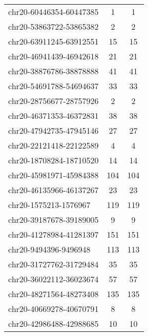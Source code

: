 \begin{longtable}{lSS}
	chr20-60446354-60447385 & 1      & 1                                         \\
	chr20-53863722-53865382 & 2      & 2                                         \\
	chr20-63911245-63912551 & 15     & 15                                        \\
	chr20-46941439-46942618 & 21     & 21                                        \\
	chr20-38876786-38878888 & 41     & 41                                        \\
	chr20-54691788-54694637 & 33     & 33                                        \\
	chr20-28756677-28757926 & 2      & 2                                         \\
	chr20-46371353-46372831 & 38     & 38                                        \\
	chr20-47942735-47945146 & 27     & 27                                        \\
	chr20-22121418-22122589 & 4      & 4                                         \\
	chr20-18708284-18710520 & 14     & 14                                        \\
	chr20-45981971-45984388 & 104    & 104                                       \\
	chr20-46135966-46137267 & 23     & 23                                        \\
	chr20-1575213-1576967   & 119    & 119                                       \\
	chr20-39187678-39189005 & 9      & 9                                         \\
	chr20-41278984-41281397 & 151    & 151                                       \\
	chr20-9494396-9496948   & 113    & 113                                       \\
	chr20-31727762-31729484 & 35     & 35                                        \\
	chr20-36022112-36023674 & 57     & 57                                        \\
	chr20-48271564-48273408 & 135    & 135                                       \\
	chr20-40669278-40670791 & 8      & 8                                         \\
	chr20-42986488-42988685 & 10     & 10                                        \\

\end{longtable}
